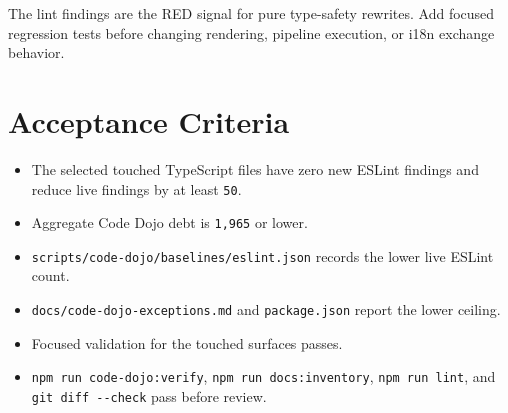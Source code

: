 The lint findings are the RED signal for pure type-safety rewrites. Add focused regression tests before changing rendering, pipeline execution, or i18n exchange behavior.

\section{Acceptance Criteria}\label{record-219-acceptance-criteria}

\begin{itemize}
\tightlist
\item
  The selected touched TypeScript files have zero new ESLint findings and reduce live findings by at least \texttt{5\allowbreak{}0}.
\item
  Aggregate Code Dojo debt is \texttt{1\allowbreak{},\allowbreak{}9\allowbreak{}6\allowbreak{}5} or lower.
\item
  \texttt{s\allowbreak{}c\allowbreak{}r\allowbreak{}i\allowbreak{}p\allowbreak{}t\allowbreak{}s\allowbreak{}/\allowbreak{}c\allowbreak{}o\allowbreak{}d\allowbreak{}e\allowbreak{}-\allowbreak{}d\allowbreak{}o\allowbreak{}j\allowbreak{}o\allowbreak{}/\allowbreak{}b\allowbreak{}a\allowbreak{}s\allowbreak{}e\allowbreak{}l\allowbreak{}i\allowbreak{}n\allowbreak{}e\allowbreak{}s\allowbreak{}/\allowbreak{}e\allowbreak{}s\allowbreak{}l\allowbreak{}i\allowbreak{}n\allowbreak{}t\allowbreak{}.\allowbreak{}j\allowbreak{}s\allowbreak{}o\allowbreak{}n} records the lower live ESLint count.
\item
  \texttt{d\allowbreak{}o\allowbreak{}c\allowbreak{}s\allowbreak{}/\allowbreak{}c\allowbreak{}o\allowbreak{}d\allowbreak{}e\allowbreak{}-\allowbreak{}d\allowbreak{}o\allowbreak{}j\allowbreak{}o\allowbreak{}-\allowbreak{}e\allowbreak{}x\allowbreak{}c\allowbreak{}e\allowbreak{}p\allowbreak{}t\allowbreak{}i\allowbreak{}o\allowbreak{}n\allowbreak{}s\allowbreak{}.\allowbreak{}m\allowbreak{}d} and \texttt{p\allowbreak{}a\allowbreak{}c\allowbreak{}k\allowbreak{}a\allowbreak{}g\allowbreak{}e\allowbreak{}.\allowbreak{}j\allowbreak{}s\allowbreak{}o\allowbreak{}n} report the lower ceiling.
\item
  Focused validation for the touched surfaces passes.
\item
  \texttt{n\allowbreak{}p\allowbreak{}m\allowbreak{} \allowbreak{}r\allowbreak{}u\allowbreak{}n\allowbreak{} \allowbreak{}c\allowbreak{}o\allowbreak{}d\allowbreak{}e\allowbreak{}-\allowbreak{}d\allowbreak{}o\allowbreak{}j\allowbreak{}o\allowbreak{}:\allowbreak{}v\allowbreak{}e\allowbreak{}r\allowbreak{}i\allowbreak{}f\allowbreak{}y}, \texttt{n\allowbreak{}p\allowbreak{}m\allowbreak{} \allowbreak{}r\allowbreak{}u\allowbreak{}n\allowbreak{} \allowbreak{}d\allowbreak{}o\allowbreak{}c\allowbreak{}s\allowbreak{}:\allowbreak{}i\allowbreak{}n\allowbreak{}v\allowbreak{}e\allowbreak{}n\allowbreak{}t\allowbreak{}o\allowbreak{}r\allowbreak{}y}, \texttt{n\allowbreak{}p\allowbreak{}m\allowbreak{} \allowbreak{}r\allowbreak{}u\allowbreak{}n\allowbreak{} \allowbreak{}l\allowbreak{}i\allowbreak{}n\allowbreak{}t}, and \texttt{g\allowbreak{}i\allowbreak{}t\allowbreak{} \allowbreak{}d\allowbreak{}i\allowbreak{}f\allowbreak{}f\allowbreak{} \allowbreak{}-\allowbreak{}-\allowbreak{}c\allowbreak{}h\allowbreak{}e\allowbreak{}c\allowbreak{}k} pass before review.

\end{itemize}
